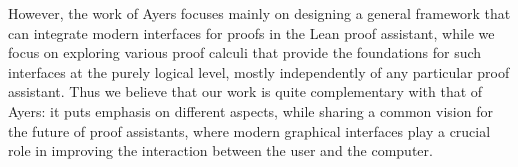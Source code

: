 However, the work of Ayers focuses mainly on designing a general framework that
can integrate modern interfaces for proofs in the Lean proof assistant, while we
focus on exploring various proof calculi that provide the foundations for such
interfaces at the purely logical level, mostly independently of any particular
proof assistant. Thus we believe that our work is quite complementary with that
of Ayers: it puts emphasis on different aspects, while sharing a common vision
for the future of proof assistants, where modern graphical interfaces play a
crucial role in improving the interaction between the user and the computer.